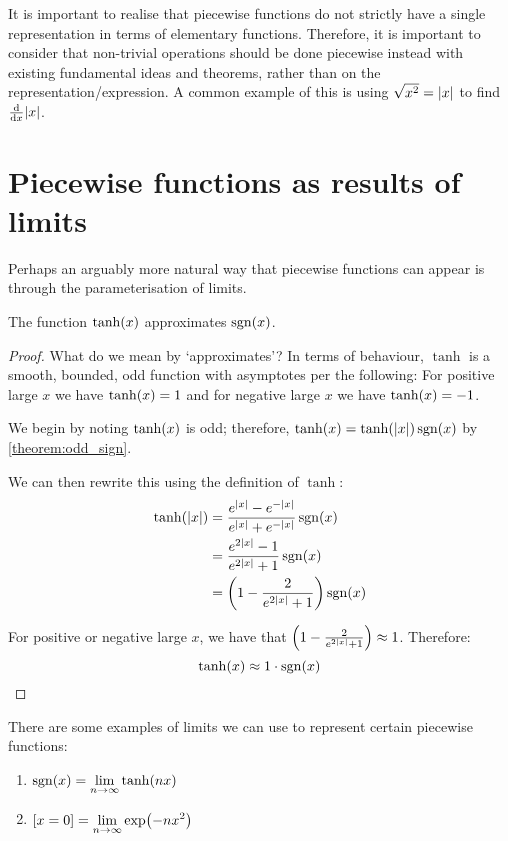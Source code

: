 It is important to realise that piecewise functions do not strictly have a single representation in terms of elementary functions. Therefore, it is important to consider that non-trivial operations should be done piecewise instead with existing fundamental ideas and theorems, rather than on the representation/expression. A common example of this is using $\sqrt{x^2}=\abs{x}$ to find $\dv{}{x}{\abs{x}}$.

\section{Piecewise functions as results of limits}
Perhaps an arguably more natural way that piecewise functions can appear is through the parameterisation of limits.

\begin{example}
    \label{example:sign_approx}
    The function $\tanh\paren{x}$ approximates $\sgn{x}$.

    \begin{proof}
        What do we mean by `approximates'? In terms of behaviour, $\tanh$ is a smooth, bounded, odd function with asymptotes per the following: For positive large $x$ we have $\tanh\paren{x}=1$ and for negative large $x$ we have $\tanh\paren{x}=-1$.

        We begin by noting $\tanh\paren{x}$ is odd; therefore, $\tanh\paren{x}=\tanh\paren{\abs{x}}\sgn{x}$ by \autoref{theorem:odd_sign}.

        We can then rewrite this using the definition of $\tanh$:
        \begin{align*}
            \tanh\paren{\abs{x}} &= \frac{e^{\abs{x}}-e^{-\abs{x}}}{e^{\abs{x}}+e^{-\abs{x}}}\sgn{x} \\
                           &= \frac{e^{2\abs{x}}-1}{e^{2\abs{x}}+1}\sgn{x} \\
                           &= \paren*{1-\frac{2}{e^{2\abs{x}}+1}}\sgn{x}
        \end{align*}

        For positive or negative large $x$, we have that $\paren*{1-\frac{2}{e^{2\abs{x}}+1}}\approx 1$. Therefore:
        $$
            \tanh\paren{x} \approx 1\cdot\sgn{x}
        $$
    \end{proof}
\end{example}

\begin{theorem}
    There are some examples of limits we can use to represent certain piecewise functions:
    \begin{enumerate}
        \item $\sgn{x}=\displaystyle\lim_{n\to\infty}{\tanh\paren*{nx}}$
        \item $[x=0]=\displaystyle\lim_{n\to\infty}{\exp\paren*{-nx^2}}$
    \end{enumerate}
\end{theorem}


